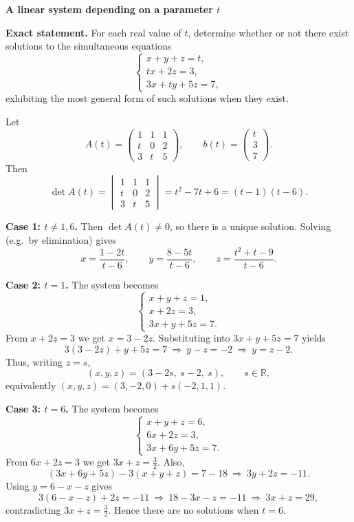 \begin{problem}[CP-I-0010]
\label{prob:cp-i-0010}
\textbf{A linear system depending on a parameter \(t\)}

\textbf{Exact statement.}
\hspace*{1.5em}For each real value of \(t\), determine whether or not there exist solutions to the simultaneous equations
\[
\begin{cases}
	x+y+z=t,\\
	tx+2z=3,\\
	3x+ty+5z=7,
\end{cases}
\]
exhibiting the most general form of such solutions when they exist.

\end{problem}

\begin{solution}
Let
\[
A(t)=\begin{pmatrix}
	1&1&1\\
	t&0&2\\
	3&t&5
\end{pmatrix},\qquad
b(t)=\begin{pmatrix}t\\3\\7\end{pmatrix}.
\]
Then
\[
\det A(t)=
\begin{vmatrix}
	1&1&1\\
	t&0&2\\
	3&t&5
\end{vmatrix}
=t^2-7t+6=(t-1)(t-6).
\]

\textbf{Case 1: \(t\neq 1,6\).}
Then \(\det A(t)\neq 0\), so there is a unique solution. Solving (e.g.\ by elimination) gives
\[
x=\frac{1-2t}{t-6},\qquad
y=\frac{8-5t}{t-6},\qquad
z=\frac{t^2+t-9}{t-6}.
\]

\textbf{Case 2: \(t=1\).}
The system becomes
\[
\begin{cases}
	x+y+z=1,\\
	x+2z=3,\\
	3x+y+5z=7.
\end{cases}
\]
From \(x+2z=3\) we get \(x=3-2z\). Substituting into \(3x+y+5z=7\) yields
\[
3(3-2z)+y+5z=7 \ \Rightarrow\ y-z=-2 \ \Rightarrow\ y=z-2.
\]
Thus, writing \(z=s\),
\[
(x,y,z)=(3-2s,\ s-2,\ s),\qquad s\in\mathbb R,
\]
equivalently \((x,y,z)=(3,-2,0)+s(-2,1,1)\).

\textbf{Case 3: \(t=6\).}
The system becomes
\[
\begin{cases}
	x+y+z=6,\\
	6x+2z=3,\\
	3x+6y+5z=7.
\end{cases}
\]
From \(6x+2z=3\) we get \(3x+z=\tfrac{3}{2}\).
Also,
\[
(3x+6y+5z)-3(x+y+z)=7-18 \ \Rightarrow\ 3y+2z=-11.
\]
Using \(y=6-x-z\) gives
\[
3(6-x-z)+2z=-11 \ \Rightarrow\ 18-3x-z=-11 \ \Rightarrow\ 3x+z=29,
\]
contradicting \(3x+z=\tfrac{3}{2}\). Hence there are no solutions when \(t=6\).
\end{solution}

